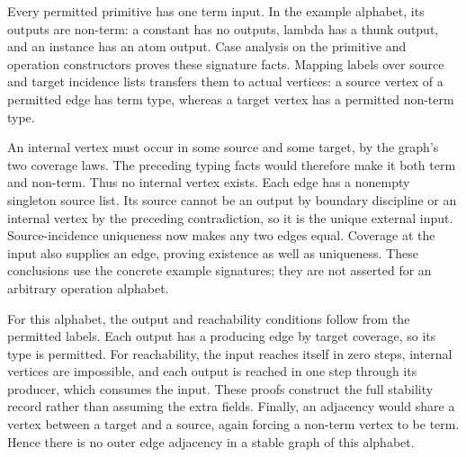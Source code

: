 


Every permitted primitive has one term input. In the example alphabet,
its outputs are non-term: a constant has no outputs, lambda has a thunk
output, and an instance has an atom output. Case analysis on the primitive
and operation constructors proves these signature facts. Mapping labels
over source and target incidence lists transfers them to actual vertices:
a source vertex of a permitted edge has term type, whereas a target vertex
has a permitted non-term type.





An internal vertex must occur in some source and some target, by the
graph's two coverage laws. The preceding typing facts would therefore
make it both term and non-term. Thus no internal vertex exists. Each edge
has a nonempty singleton source list. Its source cannot be an output by
boundary discipline or an internal vertex by the preceding contradiction,
so it is the unique external input. Source-incidence uniqueness now makes
any two edges equal. Coverage at the input also supplies an edge, proving
existence as well as uniqueness. These conclusions use the concrete example
signatures; they are not asserted for an arbitrary operation alphabet.





For this alphabet, the output and reachability conditions follow from
the permitted labels. Each output has a producing edge by target coverage,
so its type is permitted. For reachability, the input reaches itself in
zero steps, internal vertices are impossible, and each output is reached
in one step through its producer, which consumes the input. These proofs
construct the full stability record rather than assuming the extra fields.
Finally, an adjacency would share a vertex between a target and a source,
again forcing a non-term vertex to be term. Hence there is no outer edge
adjacency in a stable graph of this alphabet.

